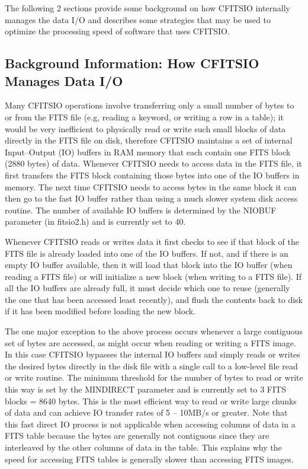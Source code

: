 \documentclass[11pt]{book}
\begin{document}
The following 2 sections provide some background on how CFITSIO
internally manages the data I/O and describes some strategies that may
be used to optimize the processing speed of software that uses
CFITSIO.


\subsection{Background Information: How CFITSIO Manages Data I/O}

Many CFITSIO operations involve transferring only a small number of
bytes to or from the FITS file (e.g, reading a keyword, or writing a
row in a table); it would be very inefficient to physically read or
write such small blocks of data directly in the FITS file on disk,
therefore CFITSIO maintains a set of internal Input--Output (IO)
buffers in RAM memory that each contain one FITS block (2880 bytes) of
data.  Whenever CFITSIO needs to access data in the FITS file, it first
transfers the FITS block containing those bytes into one of the IO
buffers in memory.  The next time CFITSIO needs to access bytes in the
same block it can then go to the fast IO buffer rather than using a
much slower system disk access routine.  The number of available IO
buffers is determined by the NIOBUF parameter (in fitsio2.h) and is
currently set to 40.

Whenever CFITSIO reads or writes data it first checks to see if that
block of the FITS file is already loaded into one of the IO buffers.
If not, and if there is an empty IO buffer available, then it will load
that block into the IO buffer (when reading a FITS file) or will
initialize a new block (when writing to a FITS file).  If all the IO
buffers are already full, it must decide which one to reuse (generally
the one that has been accessed least recently), and flush the contents
back to disk if it has been modified before loading the new block.

The one major exception to the above process occurs whenever a large
contiguous set of bytes are accessed, as might occur when reading or
writing a FITS image.  In this case CFITSIO bypasses the internal IO
buffers and simply reads or writes the desired bytes directly in the
disk file with a single call to a low-level file read or write
routine.  The minimum threshold for the number of bytes to read or
write this way is set by the MINDIRECT parameter and is currently set
to 3 FITS blocks = 8640 bytes.  This is the most efficient way to read
or write large chunks of data and can achieve IO transfer rates of
5 -- 10MB/s or greater.  Note that this fast direct IO process is not
applicable when accessing columns of data in a FITS table because the
bytes are generally not contiguous since they are interleaved by the
other columns of data in the table.  This explains why the speed for
accessing FITS tables is generally slower than accessing
FITS images.
\end{document}
